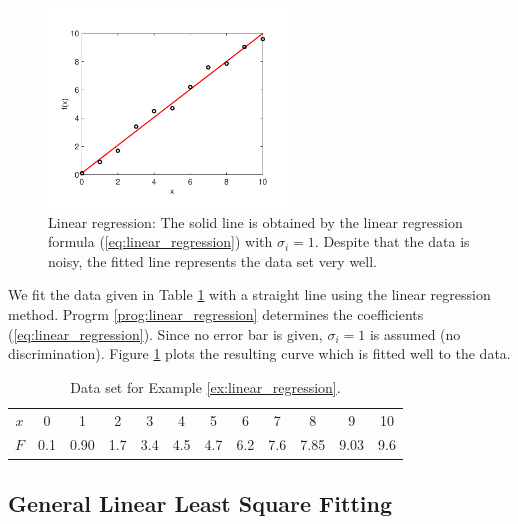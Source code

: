 \bigskip

\begin{example}\label{ex:linear_regression}

\begin{figure}
\centering
\includegraphics[width=2.5in]{12.fitting/linear_regression.pdf}
\caption{Linear regression: The solid line is obtained by the linear regression formula  (\ref{eq:linear_regression}) with $\sigma_i=1$. Despite that the data is noisy, the fitted line represents the data set very well.}\label{fig:linear_regression}
\end{figure}

We fit the data given in Table \ref{tbl:linear_regression}  with a straight line using the linear regression method.  Progrm \ref{prog:linear_regression} determines the coefficients (\ref{eq:linear_regression}).  Since no error bar is given, $\sigma_i=1$ is assumed (no discrimination).  Figure \ref{fig:linear_regression} plots the resulting curve which is fitted well to the data.

\begin{table}
\centering
\caption{Data set for Example \ref{ex:linear_regression}.}\label{tbl:linear_regression}
\begin{tabular}{c|ccccccccccc}
\hline
$x$ & 0 & 1& 2& 3& 4& 5& 6& 7& 8& 9 & 10\\
$F$ &0.1&0.90&1.7&3.4&4.5&4.7&6.2&7.6&7.85&9.03&9.6\\
\hline
\end{tabular}
\end{table}
\end{example}

\noindent
\subsection{General Linear Least Square Fitting}

